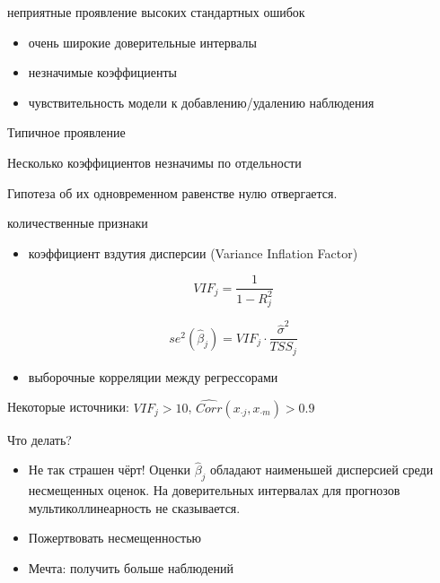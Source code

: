 \documentclass[ignorenonframetext,]{beamer}
\begin{document}
\begin{frame}{неприятные проявление высоких стандартных ошибок}

\begin{itemize}
\itemsep1pt\parskip0pt
\item
  очень широкие доверительные интервалы
\item
  незначимые коэффициенты
\item
  чувствительность модели к добавлению/удалению наблюдения
\end{itemize}

\end{frame}

\begin{frame}{Типичное проявление}

Несколько коэффициентов незначимы по отдельности

Гипотеза об их одновременном равенстве нулю отвергается.

\end{frame}

\begin{frame}{количественные признаки}

\begin{itemize}
\itemsep1pt\parskip0pt
\item
  коэффициент вздутия дисперсии (Variance Inflation Factor)
\end{itemize}

\[
VIF_j=\frac{1}{1-R^2_j}
\]

\[
se^2(\hat{\beta}_j)=VIF_j \cdot \frac{\hat{\sigma}^2}{TSS_j}
\]

\begin{itemize}
\itemsep1pt\parskip0pt
\item
  выборочные корреляции между регрессорами
\end{itemize}

Некоторые источники: \(VIF_j > 10\),
\(\widehat{Corr}(x_{\cdot j},x_{\cdot m})>0.9\)

\end{frame}

\begin{frame}{Что делать?}

\begin{itemize}
\itemsep1pt\parskip0pt
\item
  Не так страшен чёрт! Оценки \(\hat{\beta}_j\) обладают наименьшей
  дисперсией среди несмещенных оценок. На доверительных интервалах для
  прогнозов мультиколлинеарность не сказывается.
\item
  Пожертвовать несмещенностью
\item
  Мечта: получить больше наблюдений
\end{itemize}

\end{frame}
\end{document}
